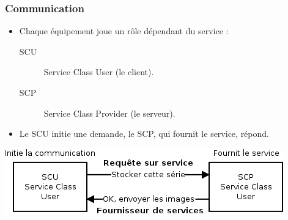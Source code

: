 \frame
{
	\frametitle{Communication}
	\begin{itemize}
		\item Chaque \'equipement joue un r\^ole d\'ependant du service :
		\begin{description}
			\item[SCU] Service Class User (le client).
			\item[SCP] Service Class Provider (le serveur).
		\end{description}
		\item Le SCU initie une demande, le SCP, qui fournit le service, r\'epond.
	\end{itemize}
	
	\begin{center}
		\includegraphics[width=.8\linewidth]{./figures/scu-scp.png}
	\end{center}
}

